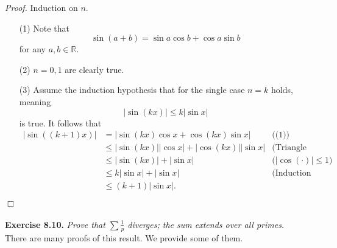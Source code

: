 \documentclass{article}
\begin{document}
\emph{Proof.}
Induction on $n$.
\begin{enumerate}
\item[(1)]
Note that
\[
  \sin(a+b) = \sin a \cos b + \cos a \sin b
\]
for any $a, b \in \mathbb{R}$.
\item[(2)]
$n = 0,1$ are clearly true.
\item[(3)]
Assume the induction hypothesis that for the single case $n = k$ holds,
meaning
\[
  |\sin(kx)| \leq k |\sin x|
\]
is true.
It follows that
\begin{align*}
  |\sin((k+1)x)|
  &= |\sin(kx) \cos x + \cos(kx) \sin x|
    &\text{((1))} \\
  &\leq |\sin(kx)| |\cos x| + |\cos(kx)| |\sin x|
    &\text{(Triangle inequality)} \\
  &\leq |\sin(kx)| + |\sin x|
    &\text{($|\cos(\cdot)| \leq 1$)} \\
  &\leq k |\sin x| + |\sin x|
    &\text{(Induction hypothesis)} \\
  &\leq (k+1)|\sin x|.
\end{align*}
\end{enumerate}
$\Box$ \\\\






\textbf{Exercise 8.10.}
\emph{Prove that $\sum \frac{1}{p}$ diverges; the sum extends over all primes.} \\

There are many proofs of this result. We provide some of them. \\
\end{document}
